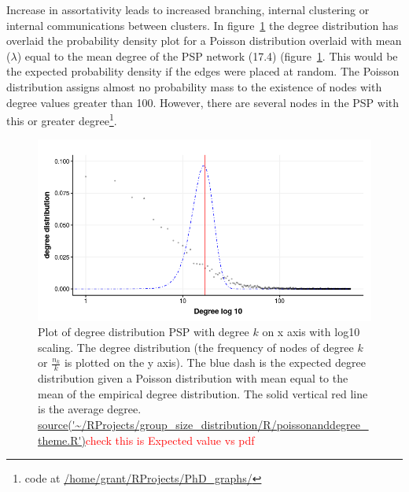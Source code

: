 Increase in assortativity leads to increased branching, internal clustering or internal communications between clusters\cite{estrada2011combinatorial}.
In figure~\ref{fig:PSP degree power-law poisson} the degree distribution has overlaid the probability density plot for a Poisson distribution overlaid with mean ($\lambda$) equal to the mean degree of the PSP network (17.4) (figure~\ref{fig:PSP degree power-law poisson}. This would be the expected probability density if the edges were placed at random. The Poisson distribution assigns almost no probability mass to the existence of nodes with degree values greater than 100. However, there are several nodes in the PSP with this or greater degree\footnote{code at \url{/home/grant/RProjects/PhD_graphs/}}.

\begin{figure}
    \centering
    \includegraphics[width=\textwidth]{images/chapter3/ggplot2/theme/powerlaw/Rplot01_poissonanddegree2.png}
    \caption[Degree distribution with Poisson pdf overlaid]{Plot of degree distribution PSP with degree $k$ on x axis with log10 scaling. The degree distribution (the frequency of nodes of degree $k$ or $\frac{n_k}{k}$ is plotted on the y axis). The blue dash is the expected degree distribution given a Poisson distribution with mean equal to the mean of the empirical degree distribution. The solid vertical red line is the average degree. \url{source('~/RProjects/group_size_distribution/R/poissonanddegree_theme.R')}\textcolor{red}{check this is Expected value vs pdf}}
    \label{fig:PSP degree power-law poisson}
\end{figure}

